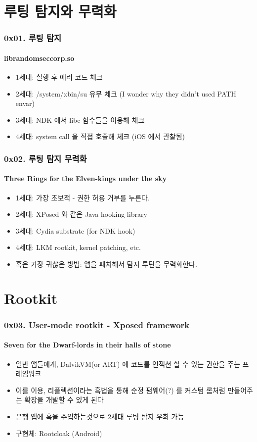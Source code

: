 \section[Section]{루팅 탐지와 무력화}
\begin{frame}
  \frametitle{0x01. 루팅 탐지}
  \framesubtitle{librandomseccorp.so}

  \begin{itemize}
  \item 1세대: 실행 후 에러 코드 체크
  \item 2세대: /system/xbin/su 유무 체크 (I wonder why they didn't used PATH envar)
  \item 3세대: NDK 에서 libc 함수들을 이용해 체크
  \item 4세대: system call 을 직접 호출해 체크 (iOS 에서 관찰됨)
  \end{itemize}
\end{frame}

\begin{frame}
  \frametitle{0x02. 루팅 탐지 무력화}
  \framesubtitle{Three Rings for the Elven-kings under the sky}

  \begin{itemize}
  \item 1세대: 가장 초보적 - 권한 허용 거부를 누른다.
  \item 2세대: XPosed 와 같은 Java hooking library
  \item 3세대: Cydia substrate (for NDK hook)
  \item 4세대: LKM rootkit, kernel patching, etc.
  \item 혹은 가장 귀찮은 방법: 앱을 패치해서 탐지 루틴을 무력화한다.
  \end{itemize}
\end{frame}

\section[Section]{Rootkit}
\begin{frame}
  \frametitle{0x03. User-mode rootkit - Xposed framework}
  \framesubtitle{Seven for the Dwarf-lords in their halls of stone}

  \begin{itemize}
  \item 일반 앱들에게, DalvikVM(or ART) 에 코드를 인젝션 할 수 있는 권한을 주는 프레임워크
  \item 이를 이용, 리플렉션이라는 흑법을 통해 순정 펌웨어(?) 를 커스텀 롬처럼 만들어주는 확장을 개발할 수 있게 된다
  \item 은행 앱에 훅을 주입하는것으로 2세대 루팅 탐지 우회 가능
  \item 구현체: Rootcloak (Android)
  \end{itemize}
\end{frame}

